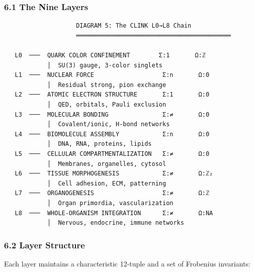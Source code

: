\documentclass[12pt,a4paper]{article}
\begin{document}
\hypertarget{the-nine-layers}{%
\subsubsection{6.1 The Nine Layers}\label{the-nine-layers}}

\begin{verbatim}
                    DIAGRAM 5: The CLINK L0→L8 Chain
                    ═══════════════════════════════════════════

   L0  ───  QUARK COLOR CONFINEMENT        Σ:1       Ω:ℤ
            │  SU(3) gauge, 3-color singlets
   L1  ───  NUCLEAR FORCE                   Σ:n       Ω:0
            │  Residual strong, pion exchange
   L2  ───  ATOMIC ELECTRON STRUCTURE       Σ:1       Ω:0
            │  QED, orbitals, Pauli exclusion
   L3  ───  MOLECULAR BONDING               Σ:≠       Ω:0
            │  Covalent/ionic, H-bond networks
   L4  ───  BIOMOLECULE ASSEMBLY            Σ:n       Ω:0
            │  DNA, RNA, proteins, lipids
   L5  ───  CELLULAR COMPARTMENTALIZATION   Σ:≠       Ω:0
            │  Membranes, organelles, cytosol
   L6  ───  TISSUE MORPHOGENESIS            Σ:≠       Ω:ℤ₂
            │  Cell adhesion, ECM, patterning
   L7  ───  ORGANOGENESIS                   Σ:≠       Ω:ℤ
            │  Organ primordia, vascularization
   L8  ───  WHOLE-ORGANISM INTEGRATION      Σ:≠       Ω:NA
            │  Nervous, endocrine, immune networks
\end{verbatim}

\hypertarget{layer-structure}{%
\subsubsection{6.2 Layer Structure}\label{layer-structure}}

Each layer maintains a characteristic 12-tuple and a set of Frobenius
invariants:
\end{document}
